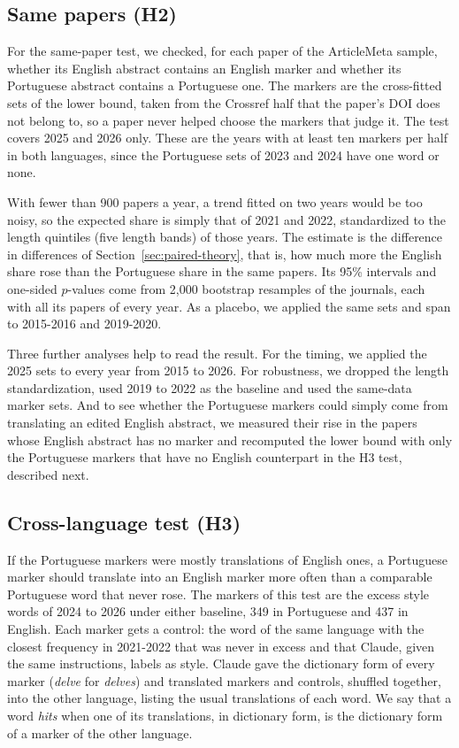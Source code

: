 \documentclass[12pt]{article}
\newcommand{\w}[1]{\textit{#1}}
\begin{document}
\subsection{Same papers (H2)}
\label{sec:h2-method}

For the same-paper test, we checked, for each paper of the ArticleMeta sample, whether its English
abstract contains an English marker and whether its Portuguese abstract contains a Portuguese one.
The markers are the cross-fitted sets of the lower bound, taken from the Crossref half that the
paper's DOI does not belong to, so a paper never helped choose the markers that judge it. The test
covers 2025 and 2026 only. These are the years with at least ten markers per half in both
languages, since the Portuguese sets of 2023 and 2024 have one word or none.

With fewer than 900 papers a year, a trend fitted on two years would be too noisy, so the expected
share is simply that of 2021 and 2022, standardized to the length quintiles (five length bands) of
those years. The estimate is the difference in differences of Section~\ref{sec:paired-theory}, that
is, how much more the English share rose than the Portuguese share in the same papers. Its 95\%
intervals and one-sided $p$-values come from 2,000 bootstrap resamples of the journals, each with
all its papers of every year. As a placebo, we applied the same sets and span to 2015-2016 and
2019-2020.

Three further analyses help to read the result. For the timing, we applied the 2025 sets to every
year from 2015 to 2026. For robustness, we dropped the length standardization, used 2019 to 2022 as
the baseline and used the same-data marker sets. And to see whether the Portuguese markers could
simply come from translating an edited English abstract, we measured their rise in the papers whose
English abstract has no marker and recomputed the lower bound with only the Portuguese markers that
have no English counterpart in the H3 test, described next.

\subsection{Cross-language test (H3)}
\label{sec:h3-method}

If the Portuguese markers were mostly translations of English ones, a Portuguese marker should
translate into an English marker more often than a comparable Portuguese word that never rose. The
markers of this test are the excess style words of 2024 to 2026 under either baseline, 349 in
Portuguese and 437 in English. Each marker gets a control: the word of the same
language with the closest frequency in 2021-2022 that was never in excess and that Claude, given
the same instructions, labels as style. Claude gave the dictionary form of every marker (\w{delve}
for \w{delves}) and translated markers and controls, shuffled together, into the other language,
listing the usual translations of each word. We say that a word \emph{hits} when one of its
translations, in dictionary form, is the dictionary form of a marker of the other language.
\end{document}
